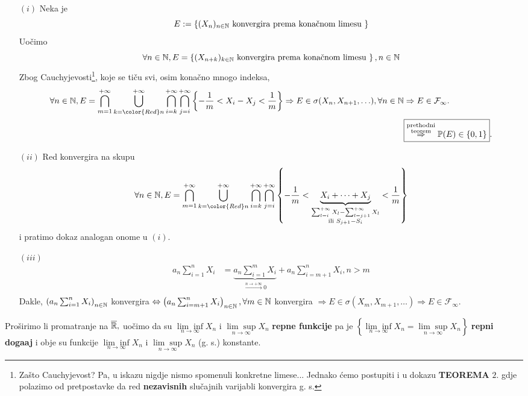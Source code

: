 \documentclass{article}
\newcommand{\mylimsup}{\underset{n\to\infty}{\lim\sup}}
\newcommand{\myliminf}{\underset{n\to\infty}{\lim\inf}}
\begin{document}
\begin{enumerate}
    \item[\((i)\)] Neka je \[E:=\left\{(X_n)_{n\in\Bbb N}\text{ konvergira prema konačnom limesu }\right\}\] Uočimo \[\forall n\in\Bbb N,E=\left\{(X_{n+k})_{k\in\Bbb N}\text{ konvergira prema konačnom limesu }\right\},n\in\Bbb N\] Zbog Cauchyjevosti\footnote[14]{Zašto Cauchyjevost? Pa, u iskazu nigdje nismo spomenuli konkretne limese... Jednako ćemo postupiti i u dokazu \textbf{TEOREMA} \(2.\) gdje polazimo od pretpostavke da red \textbf{nezavisnih} slučajnih varijabli konvergira g. s.}, koje se tiču svi, osim konačno mnogo indeksa, \[\begin{aligned}\forall n\in\Bbb N, E=\bigcap_{m=1}^{+\infty}\bigcup^{+\infty}_{k=\color{Red}n}\bigcap_{i=k}^{+\infty}\bigcap_{j=i}^{+\infty}\left\{-\frac1m<X_i-X_j<\frac1m\right\}\Rightarrow E\in\sigma(X_n,X_{n+1},\ldots),\forall n\in\Bbb N&\Rightarrow E\in\mathcal F_\infty.\\&\boxed{\overset{\substack{\text{prethodni}\\\text{teorem}}}{\Rightarrow}\Bbb P(E)\in\{0,1\}}.\end{aligned}\]
    \item[\((ii)\)] Red konvergira na skupu \[\forall n\in\Bbb N, E=\bigcap_{m=1}^{+\infty}\bigcup^{+\infty}_{k=\color{Red}n}\bigcap_{i=k}^{+\infty}\bigcap_{j=i}^{+\infty}\left\{-\frac1m<\underbrace{X_i+\cdots+X_j}_{\substack{\small{\sum_{l=i}^{+\infty}X_l-\sum_{l=j+1}^{+\infty}X_l}\\\text{ili }S_{j+1}-S_i}}<\frac1m\right\}\] i pratimo dokaz analogan onome u \((i).\)
    \item[\((iii)\)] \[\begin{aligned}a_n\sum_{i=1}^nX_i&=\underbrace{a_n\sum_{i=1}^mX_i}_{\overset{n \to +\infty}{\longrightarrow} 0}+a_n\sum_{i=m+1}^nX_i,n>m\\\end{aligned}\] Dakle, \(\left(a_n\sum_{i=1}^nX_i\right)_{n\in\Bbb N}\) konvergira \(\Leftrightarrow\left(a_n\sum_{i=m+1}^nX_i\right)_{n\in\Bbb N},\forall m\in\Bbb N\) konvergira \(\Rightarrow E\in\sigma(X_m,X_{m+1},\ldots)\Rightarrow E\in\mathcal F_\infty.\) 
\end{enumerate}
Proširimo li promatranje na \(\overline{\Bbb R},\) uočimo da su \(\myliminf X_n\) i \(\mylimsup X_n\) \textbf{repne funkcije} pa je \(\left\{\myliminf X_n=\mylimsup X_n\right\}\) \textbf{repni doga\dj{}aj} i obje su funkcije \(\myliminf X_n\) i \(\mylimsup X_n\) (g. s.) konstante.\newpage
\end{document}
